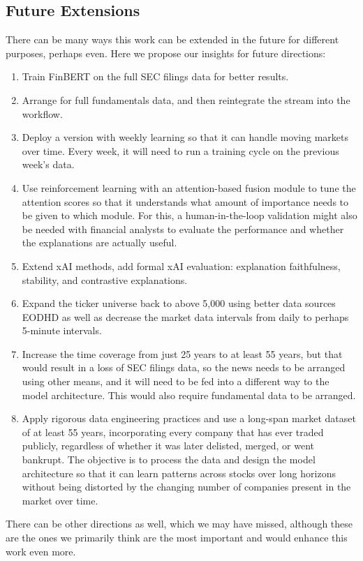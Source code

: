 \documentclass[conference]{IEEEtran}
\begin{document}
\subsection{Future Extensions}
There can be many ways this work can be extended in the future for different purposes, perhaps even. Here we propose our insights for future directions:
\begin{enumerate}
  \item Train FinBERT on the full SEC filings data for better results.
  \item Arrange for full fundamentals data, and then reintegrate the stream into the workflow.
  \item Deploy a version with weekly learning so that it can handle moving markets over time. Every week, it will need to run a training cycle on the previous week's data.
  \item Use reinforcement learning with an attention-based fusion module to tune the attention scores so that it understands what amount of importance needs to be given to which module. For this, a human-in-the-loop validation might also be needed with financial analysts to evaluate the performance and whether the explanations are actually useful.
  \item Extend xAI methods, add formal xAI evaluation: explanation faithfulness, stability, and contrastive explanations.
  \item Expand the ticker universe back to above 5,000 using better data sources EODHD\cite{eodhd} as well as decrease the market data intervals from daily to perhaps 5-minute intervals.
  \item Increase the time coverage from just 25 years to at least 55 years, but that would result in a loss of SEC filings data, so the news needs to be arranged using other means, and it will need to be fed into a different way to the model architecture. This would also require fundamental data to be arranged.
  \item Apply rigorous data engineering practices and use a long-span market dataset of at least 55 years, incorporating every company that has ever traded publicly, regardless of whether it was later delisted, merged, or went bankrupt. The objective is to process the data and design the model architecture so that it can learn patterns across stocks over long horizons without being distorted by the changing number of companies present in the market over time.
\end{enumerate}
There can be other directions as well, which we may have missed, although these are the ones we primarily think are the most important and would enhance this work even more. 
 
\end{document}
